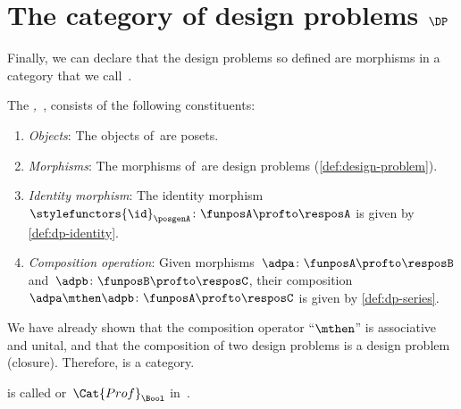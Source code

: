 
\section{The category of design problems $\DP$}

Finally, we can declare that the design problems so defined are morphisms in a category that we call~\iindex{\DP}.


\begin{definition}
	\label{def:DP}
	The \emph{,~\DP}, consists of the following constituents:
	\begin{enumerate}
		\item \emph{Objects}: The objects of~\DP are posets.
		\item \emph{Morphisms}: The morphisms of~\DP are design problems (\cref{def:design-problem}).
		\item \emph{Identity morphism}: The identity morphism~$\stylefunctors{\id}_\posgenA \colon \funposA \profto \resposA$ is given by \cref{def:dp-identity}.
		\item \emph{Composition operation}: Given morphisms~$\adpa \colon  \funposA \profto \resposB$ and~$\adpb \colon \funposB \profto \resposC$, their composition~$\adpa \mthen \adpb\colon \funposA\profto \resposC$ is given by \cref{def:dp-series}.
	\end{enumerate}
\end{definition}

We have already shown that the composition operator ``$\mthen$'' is associative and unital, and that the composition of two design problems is a design problem (closure).
Therefore, \DP is a category.

\begin{remark}
	\DP is called \feas or~$\Cat{Prof}_\Bool$ in~\cite{fong2019}.
\end{remark}

